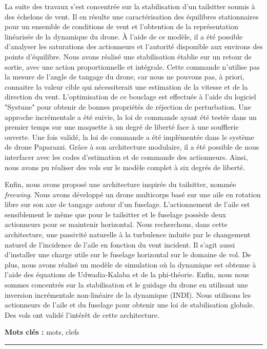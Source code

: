 \begin{vcenterpage}
La suite des travaux s'est concentrée sur la stabilisation d'un tailsitter soumis à des échelons de vent. Il en résulte une caractérisation des équilibres stationnaires pour un ensemble de conditions de vent et l'obtention de la représentation linéarisée de la dynamique du drone. À l'aide de ce modèle, il a été possible d'analyser les saturations des actionneurs et l'autorité disponible aux environs des points d'équilibre. Nous avons réalisé une stabilisation établie sur un retour de sortie, avec une action proportionnelle et intégrale. Cette commande n'utilise pas la mesure de l'angle de tangage du drone, car nous ne pouvons pas, à priori, connaitre la valeur cible qui nécessiterait une estimation de la vitesse et de la direction du vent. L'optimisation de ce bouclage est effectuée à l'aide du logiciel "Systune" pour obtenir de bonnes propriétés de réjection de perturbation. Une approche incrémentale a été suivie, la loi de commande ayant été testée dans un premier temps sur une maquette à un degré de liberté face à une soufflerie ouverte. Une fois validé, la loi de commande a été implémentée dans le système de drone Paparazzi. Grâce à son architecture modulaire, il a été possible de nous interfacer avec les codes d'estimation et de commande des actionneurs. Ainsi, nous avons pu réaliser des vols sur le modèle complet à six degrés de liberté.

Enfin, nous avons proposé une architecture inspirée du tailsitter, nommée \textit{freewing}. Nous avons développé un drone multicorps basé sur une aile en rotation libre sur son axe de tangage autour d'un fuselage. L'actionnement de l'aile est sensiblement le même que pour le tailsitter et le fuselage possède deux actionneurs pour se maintenir horizontal. Nous recherchons, dans cette architecture, une passivité naturelle à la turbulence induite par le changement naturel de l'incidence de l'aile en fonction du vent incident. Il s'agit aussi d'installer une charge utile sur le fuselage horizontal sur le domaine de vol. De plus, nous avons réalisé un modèle de simulation où la dynamique est obtenue à l'aide des équations de Udwadia-Kalaba et de la phi-théorie. Enfin, nous nous sommes concentrés sur la stabilisation et le guidage du drone en utilisant une inversion incrémentale non-linéaire de la dynamique (INDI). Nous utilisons les actionneurs de l'aile et du fuselage pour obtenir une loi de stabilisation globale. Des vols ont validé l'intérêt de cette architecture.

{\large\textbf{Mots clés :}}
mots, clefs

\noindent\rule[2pt]{\textwidth}{0.5pt}
\end{vcenterpage}

